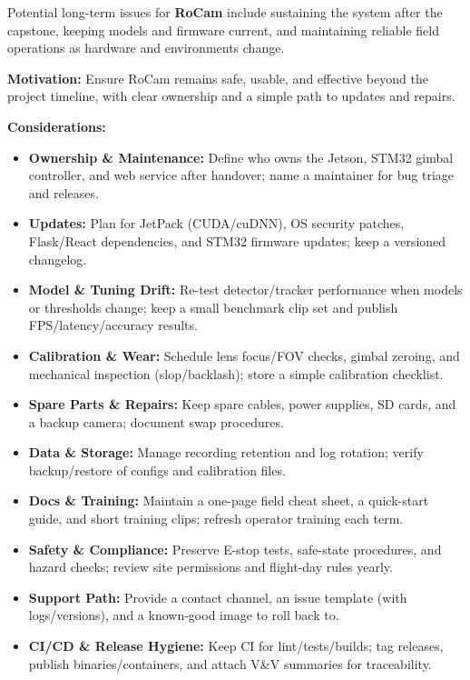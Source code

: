 \documentclass[12pt]{article}
\begin{document}
Potential long-term issues for \textbf{RoCam} include sustaining the system
after the capstone, keeping models and firmware current, and maintaining
reliable field operations as hardware and environments change.

\textbf{Motivation:} Ensure RoCam remains safe, usable, and effective beyond the project timeline, with clear ownership and a simple path to updates and repairs.

\textbf{Considerations:}
\begin{itemize}
  \item \textbf{Ownership \& Maintenance:} Define who owns the Jetson, STM32 gimbal controller, and web service after handover; name a maintainer for bug triage and releases.
  \item \textbf{Updates:} Plan for JetPack (CUDA/cuDNN), OS security patches, Flask/React dependencies, and STM32 firmware updates; keep a versioned changelog.
  \item \textbf{Model \& Tuning Drift:} Re-test detector/tracker performance when models or thresholds change; keep a small benchmark clip set and publish FPS/latency/accuracy results.
  \item \textbf{Calibration \& Wear:} Schedule lens focus/FOV checks, gimbal zeroing, and mechanical inspection (slop/backlash); store a simple calibration checklist.
  \item \textbf{Spare Parts \& Repairs:} Keep spare cables, power supplies, SD cards, and a backup camera; document swap procedures.
  \item \textbf{Data \& Storage:} Manage recording retention and log rotation; verify backup/restore of configs and calibration files.
  \item \textbf{Docs \& Training:} Maintain a one-page field cheat sheet, a quick-start guide, and short training clips; refresh operator training each term.
  \item \textbf{Safety \& Compliance:} Preserve E-stop tests, safe-state procedures, and hazard checks; review site permissions and flight-day rules yearly.
  \item \textbf{Support Path:} Provide a contact channel, an issue template (with logs/versions), and a known-good image to roll back to.
  \item \textbf{CI/CD \& Release Hygiene:} Keep CI for lint/tests/builds; tag releases, publish binaries/containers, and attach V\&V summaries for traceability.
\end{itemize}
\end{document}
